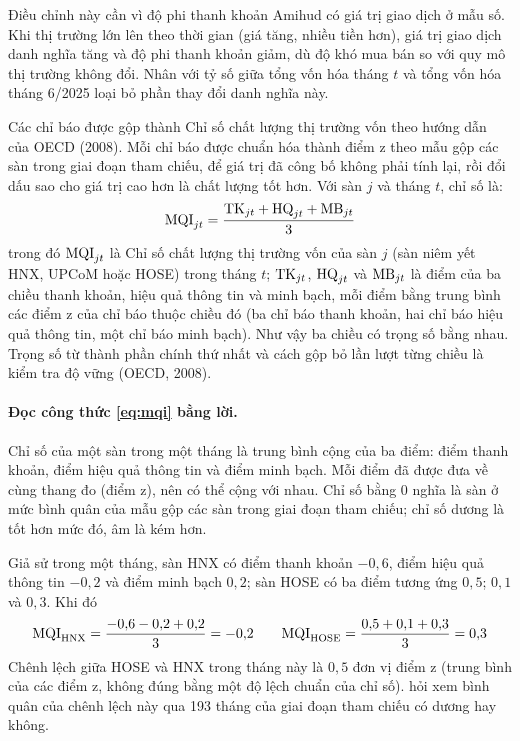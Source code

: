 Điều chỉnh này cần vì độ phi thanh khoản Amihud có giá trị giao dịch ở mẫu số. Khi thị trường lớn lên theo thời gian (giá tăng, nhiều tiền hơn), giá trị giao dịch danh nghĩa tăng và độ phi thanh khoản giảm, dù độ khó mua bán so với quy mô thị trường không đổi. Nhân với tỷ số giữa tổng vốn hóa tháng $t$ và tổng vốn hóa tháng 6/2025 loại bỏ phần thay đổi danh nghĩa này.

Các chỉ báo được gộp thành Chỉ số chất lượng thị trường vốn theo hướng dẫn của OECD (2008). Mỗi chỉ báo được chuẩn hóa thành điểm z theo mẫu gộp các sàn trong giai đoạn tham chiếu, để giá trị đã công bố không phải tính lại, rồi đổi dấu sao cho giá trị cao hơn là chất lượng tốt hơn. Với sàn $j$ và tháng $t$, chỉ số là:
\begin{equation}\label{eq:mqi}
\mathrm{MQI}_{jt} = \frac{\mathrm{TK}_{jt} + \mathrm{HQ}_{jt} + \mathrm{MB}_{jt}}{3}
\end{equation}
trong đó $\mathrm{MQI}_{jt}$ là Chỉ số chất lượng thị trường vốn của sàn $j$ (sàn niêm yết HNX, UPCoM hoặc HOSE) trong tháng $t$; $\mathrm{TK}_{jt}$, $\mathrm{HQ}_{jt}$ và $\mathrm{MB}_{jt}$ là điểm của ba chiều thanh khoản, hiệu quả thông tin và minh bạch, mỗi điểm bằng trung bình các điểm z của chỉ báo thuộc chiều đó (ba chỉ báo thanh khoản, hai chỉ báo hiệu quả thông tin, một chỉ báo minh bạch). Như vậy ba chiều có trọng số bằng nhau. Trọng số từ thành phần chính thứ nhất và cách gộp bỏ lần lượt từng chiều là kiểm tra độ vững (OECD, 2008).

\paragraph{Đọc công thức \eqref{eq:mqi} bằng lời.} Chỉ số của một sàn trong một tháng là trung bình cộng của ba điểm: điểm thanh khoản, điểm hiệu quả thông tin và điểm minh bạch. Mỗi điểm đã được đưa về cùng thang đo (điểm z), nên có thể cộng với nhau. Chỉ số bằng 0 nghĩa là sàn ở mức bình quân của mẫu gộp các sàn trong giai đoạn tham chiếu; chỉ số dương là tốt hơn mức đó, âm là kém hơn.

\begin{vidu}
Giả sử trong một tháng, sàn HNX có điểm thanh khoản $-0{,}6$, điểm hiệu quả thông tin $-0{,}2$ và điểm minh bạch $0{,}2$; sàn HOSE có ba điểm tương ứng $0{,}5$; $0{,}1$ và $0{,}3$. Khi đó
\[
\mathrm{MQI}_{\mathrm{HNX}} = \frac{-0{,}6 - 0{,}2 + 0{,}2}{3} = -0{,}2 \qquad
\mathrm{MQI}_{\mathrm{HOSE}} = \frac{0{,}5 + 0{,}1 + 0{,}3}{3} = 0{,}3
\]
Chênh lệch giữa HOSE và HNX trong tháng này là $0{,}5$ đơn vị điểm z (trung bình của các điểm z, không đúng bằng một độ lệch chuẩn của chỉ số).  hỏi xem bình quân của chênh lệch này qua 193 tháng của giai đoạn tham chiếu có dương hay không.
\end{vidu}

